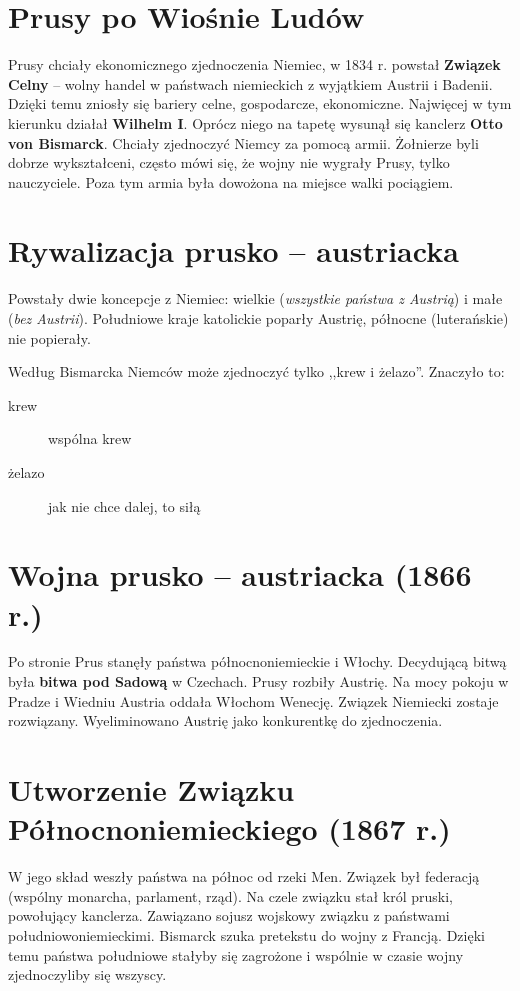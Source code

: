 \documentclass [a4paper, 11pt, oneside]{book}
\begin{document}
    \section{Prusy po Wiośnie Ludów} %
    \label{sec:prusy_po_wio_nie_lud_w}
        Prusy chciały ekonomicznego zjednoczenia Niemiec, w 1834 r. powstał \textbf{Związek Celny} -- wolny handel w państwach niemieckich z wyjątkiem Austrii i Badenii. Dzięki temu zniosły się bariery celne, gospodarcze, ekonomiczne. Najwięcej w tym kierunku działał \textbf{Wilhelm I}. Oprócz niego na tapetę wysunął się kanclerz \textbf{Otto von Bismarck}. Chciały zjednoczyć Niemcy za pomocą armii. Żołnierze byli dobrze wykształceni, często mówi się, że wojny nie wygrały Prusy, tylko nauczyciele. Poza tym armia była dowożona na miejsce walki pociągiem.
    \section{Rywalizacja prusko -- austriacka} %
    \label{sec:rywalizacja_prusko_austriacka}
        Powstały dwie koncepcje z Niemiec: wielkie (\emph{wszystkie państwa z Austrią}) i małe (\emph{bez Austrii}). Południowe kraje katolickie poparły Austrię, północne (luterańskie) nie popierały.

        Według Bismarcka Niemców może zjednoczyć tylko ,,krew i żelazo''. Znaczyło to:
        \begin{description}
            \item[krew] wspólna krew
            \item[żelazo] jak nie chce dalej, to siłą
        \end{description}
    \section{Wojna prusko -- austriacka (1866 r.)} %
    \label{sec:wojna_prusko_austriacka_}
        Po stronie Prus stanęły państwa północnoniemieckie i Włochy. Decydującą bitwą była \textbf{bitwa pod Sadową} w Czechach. Prusy rozbiły Austrię. Na mocy pokoju w Pradze i Wiedniu Austria oddała Włochom Wenecję. Związek Niemiecki zostaje rozwiązany. Wyeliminowano Austrię jako konkurentkę do zjednoczenia.
    \section{Utworzenie Związku Północnoniemieckiego (1867 r.)} %
    \label{sec:utworzenie_zwi_zku_p_nocnoniemieckiego_}
        W jego skład weszły państwa na północ od rzeki Men. Związek był federacją (wspólny monarcha, parlament, rząd). Na czele związku stał król pruski, powołujący kanclerza. Zawiązano sojusz wojskowy związku z państwami południowoniemieckimi. Bismarck szuka pretekstu do wojny z Francją. Dzięki temu państwa południowe stałyby się zagrożone i wspólnie w czasie wojny zjednoczyliby się wszyscy.
\end{document}
